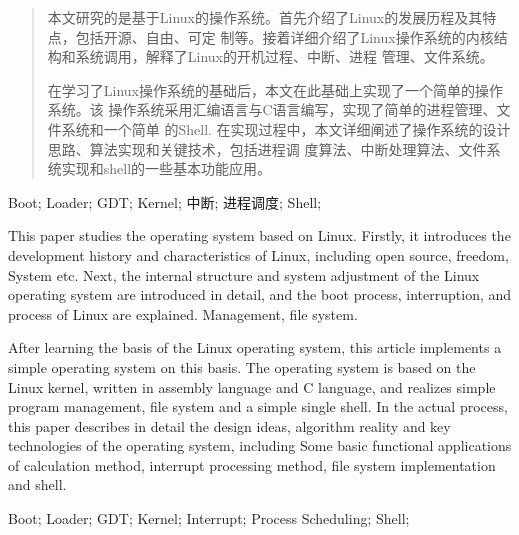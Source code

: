 \documentclass{swfuthesis}
\begin{document}
\maketitle
\frontmatter

\begin{abstract} %
  本文研究的是基于Linux的操作系统。首先介绍了Linux的发展历程及其特点，包括开源、自由、可定
  制等。接着详细介绍了Linux操作系统的内核结构和系统调用，解释了Linux的开机过程、中断、进程
  管理、文件系统。

  在学习了Linux操作系统的基础后，本文在此基础上实现了一个简单的操作系统。该
  操作系统采用汇编语言与C语言编写，实现了简单的进程管理、文件系统和一个简单
  的Shell. 在实现过程中，本文详细阐述了操作系统的设计思路、算法实现和关键技术，包括进程调
  度算法、中断处理算法、文件系统实现和shell的一些基本功能应用。
\end{abstract}

\begin{keyword} %
Boot; Loader; GDT; Kernel; 中断; 进程调度; Shell;
\end{keyword}

\begin{EAbstract}
  This paper studies the operating system based on Linux. Firstly, it introduces the development history and characteristics of Linux, including open source, freedom,
  System etc. Next, the internal structure and system adjustment of the Linux operating system are introduced in detail, and the boot process, interruption, and process of Linux are explained.
  Management, file system.

  After learning the basis of the Linux operating system, this article implements a simple operating system on this basis.
  The operating system is based on the Linux kernel, written in assembly language and C language, and realizes simple program management, file system and a simple single
  shell. In the actual process, this paper describes in detail the design ideas, algorithm reality and key technologies of the operating system, including
  Some basic functional applications of calculation method, interrupt processing method, file system implementation and shell.
\end{EAbstract}
\begin{EKeyword}
Boot; Loader; GDT; Kernel; Interrupt; Process Scheduling; Shell;  
\end{EKeyword}

\tableofcontents     %
\cleardoublepage %
\end{document}

